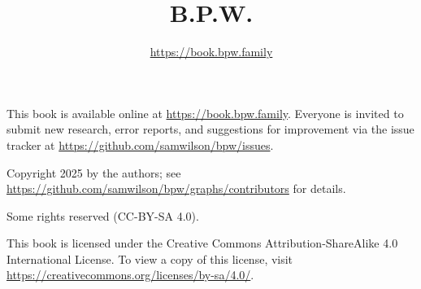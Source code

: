 \documentclass[a4paper]{book}
\title{B.P.W.}
\author{\url{https://book.bpw.family}}
\begin{document}
\maketitle
 
\thispagestyle{empty}
\begin{center}\footnotesize
This book is available online at \url{https://book.bpw.family}.
Everyone is invited to submit new research, error reports, and suggestions for improvement
via the issue tracker at \url{https://github.com/samwilson/bpw/issues}.

\vspace{1cm}

Copyright 2025 by the authors;
see \url{https://github.com/samwilson/bpw/graphs/contributors} for details.

Some rights reserved (CC-BY-SA 4.0).

This book is licensed under the Creative Commons Attribution-ShareAlike 4.0 International License.
To view a copy of this license, visit \url{https://creativecommons.org/licenses/by-sa/4.0/}.
\end{center}

\tableofcontents








\printindex
\end{document}
